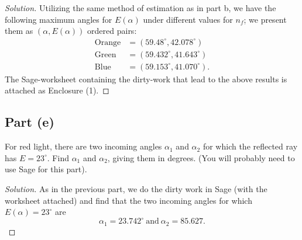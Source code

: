 \documentclass[letterpaper, 12pt]{amsart}
\theoremstyle{definition}  %
\begin{document}
		\begin{proof}[Solution]
		Utilizing the same method of estimation as in part b, we have the following maximum angles for $E(\alpha)$ under different values for $n_{f}$; we present them as $(\alpha, E(\alpha))$ ordered pairs:
			\begin{align*}
				\text{Orange} &= (59.48^{\circ}, 42.078^{\circ}) \\
				\text{Green} &= (59.432^{\circ}, 41.643^{\circ}) \\
				\text{Blue} &= (59.153^{\circ}, 41.070^{\circ}).
			\end{align*}
		The Sage-worksheet containing the dirty-work that lead to the above results is attached as Enclosure (1).
		\end{proof}

		\subsection*{Part (e)}
		For red light, there are two incoming angles $\alpha_{1}$ and $\alpha_{2}$ for which the reflected ray has $E = 23^{\circ}$. 
		Find $\alpha_{1}$ and $\alpha_{2}$, giving them in degrees. 
		(You will probably need to use Sage for this part).

		\begin{proof}[Solution]
		As in the previous part, we do the dirty work in Sage (with the worksheet attached) and find that the two incoming angles for which $E(\alpha) = 23^{\circ}$ are $$\alpha_{1} = 23.742^{\circ} \ \text{and} \ \alpha_{2} = 85.627.$$
		\end{proof}
\end{document}
